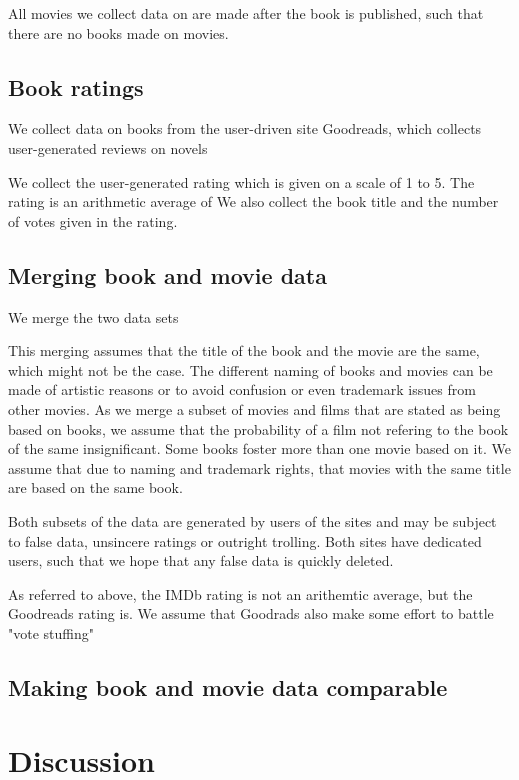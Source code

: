 \documentclass[12pt]{article}
\begin{document}
All movies we collect data on are made after the book is published, such that there are no books made on movies. 

\subsection{Book ratings} %
\label{sub:book_ratings}
We collect data on books from the user-driven site Goodreads, which collects user-generated reviews on novels

We collect the user-generated rating which is given on a scale of 1 to 5. The rating is an arithmetic average of We also collect the book title and the number of votes given in the rating. 


\subsection{Merging book and movie data}
We merge the two data sets

This merging assumes that the title of the book and the movie are the same, which might not be the case. The different naming of books and movies can be made of artistic reasons or to avoid confusion or even trademark issues from other movies. As we merge a subset of movies and films that are stated as being based on books, we assume that the probability of a film not refering to the book of the same insignificant. Some books foster more than one movie based on it. We assume that due to naming and trademark rights, that movies with the same title are based on the same book.


Both subsets of the data are generated by users of the sites and may be subject to false data, unsincere ratings or outright trolling. Both sites have dedicated users, such that we hope that any false data is quickly deleted. 

As referred to above, the IMDb rating is not an arithemtic average, but the Goodreads rating is. We assume that Goodrads also make some effort to battle "vote stuffing"

\subsection{Making book and movie data comparable}

\section{Discussion} %
\label{sec:discussion}
\end{document}
